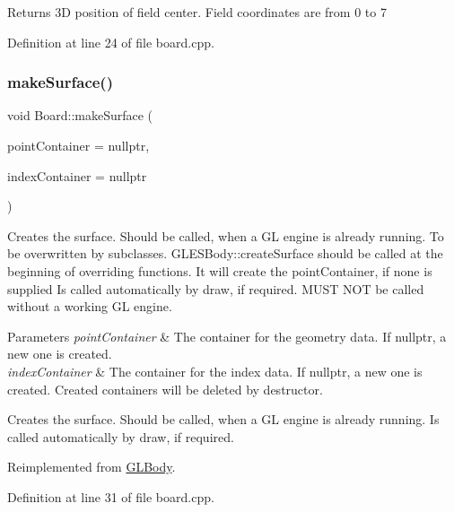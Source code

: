 Returns 3D position of field center. Field coordinates are from 0 to 7 

Definition at line 24 of file board.\+cpp.

\mbox{\label{class_board_a4a8568ce7d13db61b01e6bf14e7b12fd}} 
\subsubsection{\texorpdfstring{makeSurface()}{makeSurface()}}
{\footnotesize\ttfamily void Board\+::make\+Surface (\begin{DoxyParamCaption}\item[{Q\+Vector$<$ \mbox{\hyperlink{class_g_l_point}{G\+L\+Point}} $>$ $\ast$}]{point\+Container = {\ttfamily nullptr},  }\item[{Q\+Vector$<$ \mbox{\hyperlink{gldefines_8h_af3c748960f29c42e5b7f1dc449ab66ff}{Index\+Type}} $>$ $\ast$}]{index\+Container = {\ttfamily nullptr} }\end{DoxyParamCaption})\hspace{0.3cm}{\ttfamily [virtual]}}

Creates the surface. Should be called, when a GL engine is already running. To be overwritten by subclasses. G\+L\+E\+S\+Body\+::create\+Surface should be called at the beginning of overriding functions. It will create the point\+Container, if none is supplied Is called automatically by draw, if required. M\+U\+ST N\+OT be called without a working GL engine.


\begin{DoxyParams}{Parameters}
{\em point\+Container} & The container for the geometry data. If nullptr, a new one is created. \\
\hline
{\em index\+Container} & The container for the index data. If nullptr, a new one is created. Created containers will be deleted by destructor.\\
\hline
\end{DoxyParams}
Creates the surface. Should be called, when a GL engine is already running. Is called automatically by draw, if required. 

Reimplemented from \mbox{\hyperlink{class_g_l_body_a73e51b159f343d0bda87f50df382b7db}{G\+L\+Body}}.



Definition at line 31 of file board.\+cpp.



